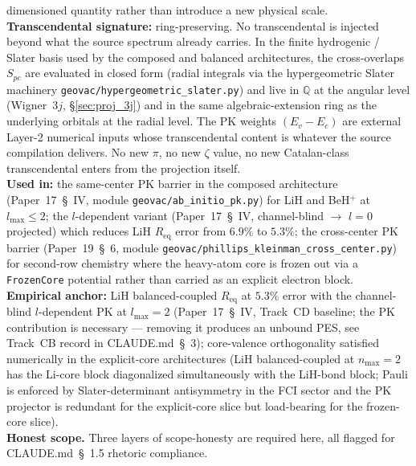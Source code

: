 \documentclass[11pt]{article}
\begin{document}
dimensioned quantity rather than introduce a new physical scale.\\
\textbf{Transcendental signature:} ring-preserving.  No transcendental
is injected beyond what the source spectrum already carries.  In the
finite hydrogenic / Slater basis used by the composed and balanced
architectures, the cross-overlaps $S_{pc}$ are evaluated in closed
form (radial integrals via the hypergeometric Slater machinery
\texttt{geovac/hypergeometric\_slater.py}) and live in $\mathbb{Q}$ at
the angular level (Wigner~$3j$, \S\ref{sec:proj_3j}) and in the same
algebraic-extension ring as the underlying orbitals at the radial
level.  The PK weights $(E_v - E_c)$ are external Layer-2 numerical
inputs whose transcendental content is whatever the source compilation
delivers.  No new $\pi$, no new $\zeta$ value, no new Catalan-class
transcendental enters from the projection itself.\\
\textbf{Used in:} the same-center PK barrier in the composed
architecture (Paper~17~\S~IV, module
\texttt{geovac/ab\_initio\_pk.py}) for LiH and BeH$^+$ at
$l_\text{max} \leq 2$; the $l$-dependent variant
(Paper~17~\S~IV, channel-blind $\to$ $l = 0$ projected) which
reduces LiH $R_\text{eq}$ error from $6.9\%$ to $5.3\%$; the
cross-center PK barrier
(Paper~19~\S~6, module
\texttt{geovac/phillips\_kleinman\_cross\_center.py}) for second-row
chemistry where the heavy-atom core is frozen out via a
\texttt{FrozenCore} potential rather than carried as an explicit
electron block.\\
\textbf{Empirical anchor:} LiH balanced-coupled $R_\text{eq}$ at
$5.3\%$ error with the channel-blind $l$-dependent PK at
$l_\text{max} = 2$ (Paper~17~\S~IV, Track~CD baseline; the
PK contribution is necessary --- removing it produces an unbound PES,
see Track~CB record in CLAUDE.md~\S~3); core-valence
orthogonality satisfied numerically in the explicit-core architectures
(LiH balanced-coupled at $n_\text{max}=2$ has the Li-core block
diagonalized simultaneously with the LiH-bond block; Pauli is
enforced by Slater-determinant antisymmetry in the FCI sector and the
PK projector is redundant for the explicit-core slice but
load-bearing for the frozen-core slice).\\
\textbf{Honest scope.}  Three layers of scope-honesty are required
here, all flagged for CLAUDE.md~\S~1.5 rhetoric compliance.
\end{document}
